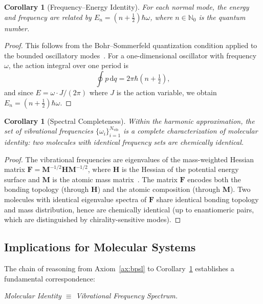 \documentclass[11pt,twocolumn,a4paper]{article}
\newtheorem{corollary}[theorem]{Corollary}
\theoremstyle{definition}
\theoremstyle{remark}
\newcommand{\Natural}{\mathbb{N}}
\newcommand{\Nvib}{N_{\mathrm{vib}}}
\begin{document}
\begin{corollary}[Frequency--Energy Identity]
\label{cor:freq-energy}
For each normal mode, the energy and frequency are related by $E_n = (n + \tfrac{1}{2})\hbar\omega$, where $n \in \Natural_0$ is the quantum number.
\end{corollary}

\begin{proof}
This follows from the Bohr--Sommerfeld quantization condition applied to the bounded oscillatory modes~\citep{bohr1913, planck1901}. For a one-dimensional oscillator with frequency $\omega$, the action integral over one period is
\[
  \oint p \, \mathrm{d}q = 2\pi \hbar \left(n + \tfrac{1}{2}\right),
\]
and since $E = \omega \cdot J/(2\pi)$ where $J$ is the action variable, we obtain $E_n = (n + \tfrac{1}{2})\hbar\omega$.
\end{proof}

\begin{corollary}[Spectral Completeness]
\label{cor:spectral-completeness}
Within the harmonic approximation, the set of vibrational frequencies $\{\omega_i\}_{i=1}^{\Nvib}$ is a complete characterization of molecular identity: two molecules with identical frequency sets are chemically identical.
\end{corollary}

\begin{proof}
The vibrational frequencies are eigenvalues of the mass-weighted Hessian matrix $\mathbf{F} = \mathbf{M}^{-1/2} \mathbf{H} \mathbf{M}^{-1/2}$, where $\mathbf{H}$ is the Hessian of the potential energy surface and $\mathbf{M}$ is the atomic mass matrix~\citep{wilson1955}. The matrix $\mathbf{F}$ encodes both the bonding topology (through $\mathbf{H}$) and the atomic composition (through $\mathbf{M}$). Two molecules with identical eigenvalue spectra of $\mathbf{F}$ share identical bonding topology and mass distribution, hence are chemically identical (up to enantiomeric pairs, which are distinguished by chirality-sensitive modes).
\end{proof}

\subsection{Implications for Molecular Systems}
\label{sec:molecular-implications}

The chain of reasoning from Axiom~\ref{ax:bpsl} to Corollary~\ref{cor:spectral-completeness} establishes a fundamental correspondence:
\begin{center}
\emph{Molecular Identity $\equiv$ Vibrational Frequency Spectrum.}
\end{center}
\end{document}
